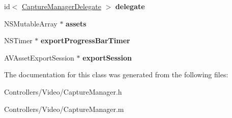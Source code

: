 \begin{DoxyCompactItemize}
\item 
\hypertarget{interface_capture_manager_a0aecfbc7f71a888ad4da48bda7c7304f}{}id$<$ \hyperlink{protocol_capture_manager_delegate-p}{Capture\+Manager\+Delegate} $>$ {\bfseries delegate}\label{interface_capture_manager_a0aecfbc7f71a888ad4da48bda7c7304f}

\item 
\hypertarget{interface_capture_manager_a28141ab77d84319f476323d77e7eb964}{}N\+S\+Mutable\+Array $\ast$ {\bfseries assets}\label{interface_capture_manager_a28141ab77d84319f476323d77e7eb964}

\item 
\hypertarget{interface_capture_manager_ad59a40caeea68e8c046d17811af4d1d1}{}N\+S\+Timer $\ast$ {\bfseries export\+Progress\+Bar\+Timer}\label{interface_capture_manager_ad59a40caeea68e8c046d17811af4d1d1}

\item 
\hypertarget{interface_capture_manager_a1e3b450690b471a27a61dbfdad4bc893}{}A\+V\+Asset\+Export\+Session $\ast$ {\bfseries export\+Session}\label{interface_capture_manager_a1e3b450690b471a27a61dbfdad4bc893}

\end{DoxyCompactItemize}


The documentation for this class was generated from the following files\+:\begin{DoxyCompactItemize}
\item 
Controllers/\+Video/Capture\+Manager.\+h\item 
Controllers/\+Video/Capture\+Manager.\+m\end{DoxyCompactItemize}

